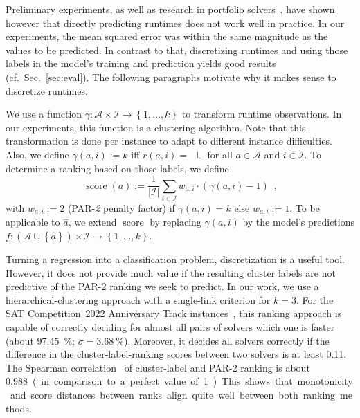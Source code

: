 \documentclass[runningheads]{llncs}
\begin{document}
Preliminary experiments, as well as research in portfolio solvers~\cite{NgokoCT19,CollauttiMMO13}, have shown however that directly predicting runtimes does not work well in practice.
In our experiments, the mean squared error was within the same magnitude as the values to be predicted.
In contrast to that, discretizing runtimes and using those labels in the model's training and prediction yields good results (cf.~Sec.~\ref{sec:eval}).
The following paragraphs motivate why it makes sense to discretize runtimes.

We use a function $\gamma\!: {\mathcal{A} \times \mathcal{I}} \rightarrow \left\lbrace 1, \dots, k \right\rbrace$ to transform runtime observations.
In our experiments, this function is a clustering algorithm.
Note that this transformation is done per instance to adapt to different instance difficulties. 
Also, we define ${\gamma\!\left(a, i\right) := k}$ iff $r\!\left(a, i\right) = \,\perp$ for all $a \in \mathcal{A}$ and $i \in \mathcal{I}$.
To determine a ranking based on those labels, we define
\begin{equation}
  \operatorname{score}\!\left(a\right) := \frac{1}{|\mathcal{I}|} \sum_{i \in \mathcal{I}} w_{a,i} \cdot \left(\gamma\!\left(a, i\right) - 1\right) \enspace \textrm{,}
  \label{eq:rankingeq}
\end{equation}
with $w_{a,i} := 2$ (PAR-\emph{2} penalty factor) if $\gamma\!\left(a, i\right) = k$ else $w_{a,i} := 1$.
To be applicable to $\hat{a}$, we extend $\operatorname{score}$ by replacing $\gamma\!\left(a, i\right)$ by the model's predictions $f\!: \left(\mathcal{A} \cup \left\lbrace \hat{a} \right\rbrace\right) \times \mathcal{I} \rightarrow \left\lbrace 1, \dots, k \right\rbrace$.

Turning a regression into a classification problem, discretization is a useful tool.
However, it does not provide much value if the resulting cluster labels are not predictive of the PAR-2 ranking we seek to predict.
In our work, we use a hierarchical-clustering approach with a single-link criterion for $k = 3$.
For the SAT Competition~2022 Anniversary Track instances~\cite{sat2022}, this ranking approach is capable of correctly deciding for almost all pairs of solvers which one is faster (about \SI{97.45}{\%}; $\sigma = \SI{3.68}{\%}$).
Moreover, it decides all solvers correctly if the difference in the cluster-label-ranking scores between two solvers is at least \SI{0.11}{}.
The Spearman correlation~\cite{de2016comparing} of cluster-label and PAR-2 ranking is about \SI{0.988} (in comparison to a perfect value of \SI{1}).
This shows that monotonicity and score distances between ranks align quite well between both ranking methods.
\end{document}

